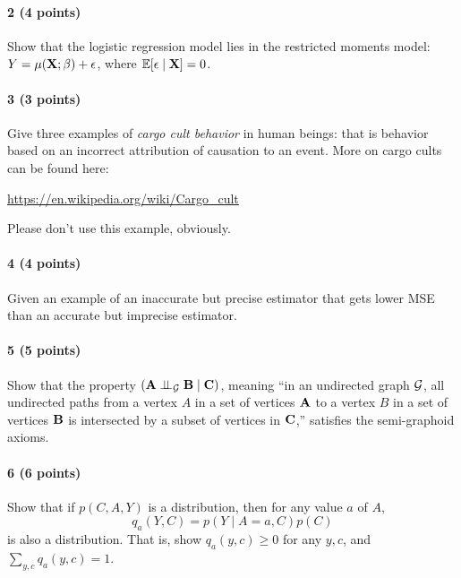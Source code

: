 \documentclass[11pt]{article}
\def\ci{\perp\!\!\!\perp}
\begin{document}
\paragraph{2 (4 points)}
Show that the logistic regression model lies in the restricted moments model:
$Y = \mu({\bf X}; \beta) + \epsilon$, where $\mathbb{E}[\epsilon \mid {\bf X}] = 0$.

\paragraph{3 (3 points)}
Give three examples of \emph{cargo cult behavior} in human beings: that is behavior based on an incorrect attribution of causation to an event.  More on cargo cults can be found here:
\begin{center}
\href{https://en.wikipedia.org/wiki/Cargo\_cult}{https://en.wikipedia.org/wiki/Cargo\_cult}
\end{center}
Please don't use this example, obviously.

\paragraph{4 (4 points)}

Given an example of an inaccurate but precise estimator that gets lower MSE than an accurate but imprecise estimator.

\paragraph{5 (5 points)}

Show that the property $({\bf A} \ci_{\cal G} {\bf B} \mid {\bf C})$, meaning ``in an undirected graph ${\cal G}$, all undirected paths from a vertex $A$ in a set of vertices ${\bf A}$ to a vertex $B$ in a set of vertices ${\bf B}$ is intersected by a subset of vertices in ${\bf C}$,'' satisfies the semi-graphoid axioms.

\paragraph{6 (6 points)}

Show that if $p(C,A,Y)$ is a distribution, then for any value $a$ of $A$,
\[
q_a(Y, C) = p(Y \mid A = a, C) p(C)
\]
is also a distribution.  That is, show $q_a(y,c) \geq 0$ for any $y,c$, and $\sum_{y,c} q_a(y,c) = 1$.
\end{document}
